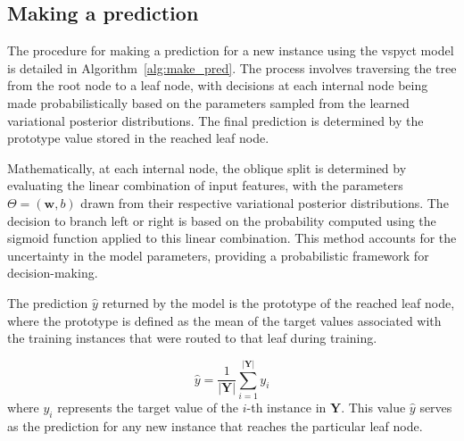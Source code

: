 \documentclass[3p,review,authoryear]{elsarticle}
\begin{document}
\subsection{Making a prediction}

The procedure for making a prediction for a new instance using the \gls{vspyct} model is detailed in Algorithm~\ref{alg:make_pred}.
The process involves traversing the tree from the root node to a leaf node, with decisions at each internal node being made probabilistically based on the parameters sampled from the learned variational posterior distributions.
The final prediction is determined by the prototype value stored in the reached leaf node.

Mathematically, at each internal node, the oblique split is determined by evaluating the linear combination of input features, with the parameters \(\Theta = (\mathbf{w}, b)\) drawn from their respective variational posterior distributions. The decision to branch left or right is based on the probability computed using the sigmoid function applied to this linear combination. This method accounts for the uncertainty in the model parameters, providing a probabilistic framework for decision-making.

The prediction \(\hat{y}\) returned by the model is the prototype of the reached leaf node, where the prototype is defined as the mean of the target values associated with the training instances that were routed to that leaf during training.

\begin{equation}
\hat{y} = \frac{1}{|\mathbf{Y}|} \sum_{i=1}^{|\mathbf{Y}|} y_i
\end{equation}
where \( y_i \) represents the target value of the \(i\)-th instance in \(\mathbf{Y}\).
This value $\hat{y}$ serves as the prediction for any new instance that reaches the particular leaf node.
\end{document}
